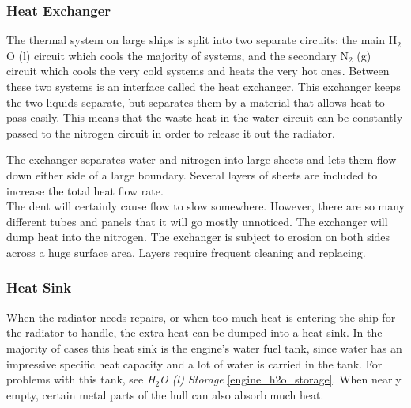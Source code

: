 \documentclass[a4paper]{article}
\begin{document}
\vspace{-0.5cm} \hspace{-18pt} \subsubsection{Heat Exchanger} \label{thermal_exchanger} \vspace{-0.2cm}
The thermal system on large ships is split into two separate circuits: the main H$_2$O (l) circuit which cools the majority of systems, and the secondary N$_2$ (g) circuit which cools the very cold systems and heats the very hot ones. Between these two systems is an interface called the heat exchanger. This exchanger keeps the two liquids separate, but separates them by a material that allows heat to pass easily. This means that the waste heat in the water circuit can be constantly passed to the nitrogen circuit in order to release it out the radiator.

The exchanger separates water and nitrogen into large sheets and lets them flow down either side of a large boundary. Several layers of sheets are included to increase the total heat flow rate.
\\ \pbhw
{}
{The dent will certainly cause flow to slow somewhere. However, there are so many different tubes and panels that it will go mostly unnoticed.}
{The exchanger will dump heat into the nitrogen.}
{The exchanger is subject to erosion on both sides across a huge surface area. Layers require frequent cleaning and replacing.}


\vspace{-0.5cm} \hspace{-18pt} \subsubsection{Heat Sink} \label{thermal_sink} \vspace{-0.2cm}
When the radiator needs repairs, or when too much heat is entering the ship for the radiator to handle, the extra heat can be dumped into a heat sink. In the majority of cases this heat sink is the engine's water fuel tank, since water has an impressive specific heat capacity and a lot of water is carried in the tank. For problems with this tank, see \textit{H$_2$O (l) Storage} \ref{engine_h2o_storage}. When nearly empty, certain metal parts of the hull can also absorb much heat. 
\end{document}

